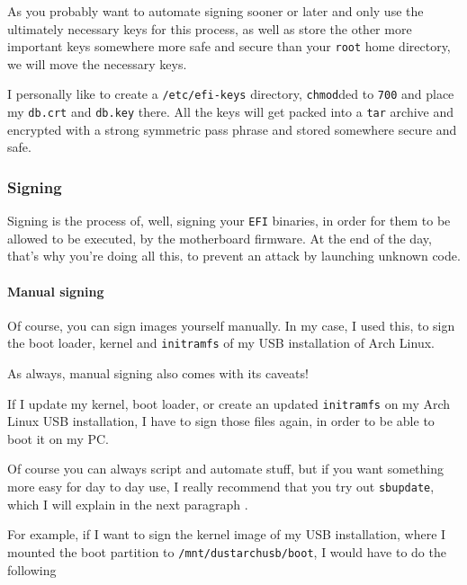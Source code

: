 \documentclass[10pt]{dustdoc}
\begin{document}
As you probably want to automate signing sooner or later and only use the ultimately necessary keys for this process, as well as store the other more important keys somewhere more safe and secure than your \texttt{root} home directory, we will move the necessary keys.

I personally like to create a \texttt{/etc/efi-keys} directory, \texttt{chmod}ded to \texttt{700} and place my \texttt{db.crt} and \texttt{db.key} there.
All the keys will get packed into a \texttt{tar} archive and encrypted with a strong symmetric pass phrase and stored somewhere secure and safe.

\subsubsection{Signing}
\label{sec:signing}

Signing is the process of, well, signing your \texttt{EFI} binaries, in order for them to be allowed to be executed, by the motherboard firmware.
At the end of the day, that’s why you’re doing all this, to prevent an attack by launching unknown code.

\paragraph{Manual signing}
\label{par:manual-signing}

Of course, you can sign images yourself manually.
In my case, I used this, to sign the boot loader, kernel and \texttt{initramfs} of my USB installation of Arch Linux.

\begin{NOTE}
    As always, manual signing also comes with its caveats!

    If I update my kernel, boot loader, or create an updated \texttt{initramfs} on my Arch Linux USB installation, I have to sign those files again, in order to be able to boot it on my PC.

    Of course you can always script and automate stuff, but if you want something more easy for day to day use, I really recommend that you try out \texttt{sbupdate},  which I will explain in the next paragraph .
\end{NOTE}

For example, if I want to sign the kernel image of my USB installation, where I mounted the boot partition to \texttt{/mnt/dustarchusb/boot}, I would have to do the following
\end{document}
